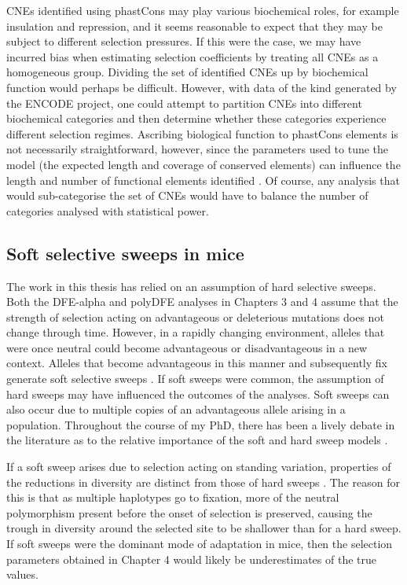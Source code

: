 	CNEs identified using phastCons \citep{RN353} may play various biochemical roles, for example insulation and repression, and it seems reasonable to expect that they may be subject to different selection pressures. If this were the case, we may have incurred bias when estimating selection coefficients by treating all CNEs as a homogeneous group. Dividing the set of identified CNEs up by biochemical function would perhaps be difficult. However, with data of the kind generated by the ENCODE project, one could attempt to partition CNEs into different biochemical categories and then determine whether these categories experience different selection regimes. Ascribing biological function to phastCons elements is not necessarily straightforward, however, since the parameters used to tune the model (the expected length and coverage of conserved elements) can influence the length and number of functional elements identified \citep{RN376}. Of course, any analysis that would sub-categorise the set of CNEs would have to balance the number of categories analysed with statistical power.
	
 \subsection{Soft selective sweeps in mice}

	The work in this thesis has relied on an assumption of hard selective sweeps. Both the DFE-alpha and polyDFE analyses in Chapters 3 and 4 assume that the strength of selection acting on advantageous or deleterious mutations does not change through time. However, in a rapidly changing environment, alleles that were once neutral could become advantageous or disadvantageous in a new context. Alleles that become advantageous in this manner and subsequently fix generate soft selective sweeps \citep{RN336}. If soft sweeps were common, the assumption of hard sweeps may have influenced the outcomes of the analyses. Soft sweeps can also occur due to multiple copies of an advantageous allele arising in a population. Throughout the course of my PhD, there has been a lively debate in the literature as to the  relative importance of the soft and hard sweep models \citep{RN153, RN336}.

	If a soft sweep arises due to selection acting on standing variation, properties of the reductions in diversity are distinct from those of hard sweeps \citep{RN336}. The reason for this is that as multiple haplotypes go to fixation, more of the neutral polymorphism present before the onset of selection is preserved, causing the trough in diversity around the selected site to be shallower than for a hard sweep. If soft sweeps were the dominant mode of adaptation in mice, then the selection parameters obtained in Chapter 4 would likely be underestimates of the true values. 
	
